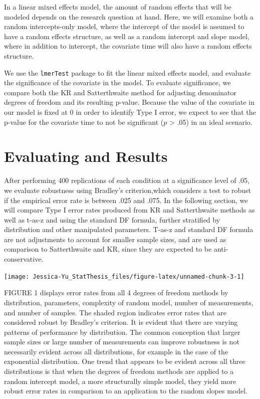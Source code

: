 \documentclass[12pt, twoside]{amherstthesis}
\begin{document}
In a linear mixed effects model, the amount of random effects that will be modeled depends on the research question at hand. Here, we will examine both a random intercepts-only model, where the intercept of the model is assumed to have a random effects structure, as well as a random intercept and slope model, where in addition to intercept, the covariate time will also have a random effects structure.

We use the \texttt{lmerTest} package to fit the linear mixed effects model, and evaluate the significance of the covariate in the model. To evaluate significance, we compare both the KR and Satterthwaite method for adjusting denominator degrees of freedom and its resulting p-value. Because the value of the covariate in our model is fixed at 0 in order to identify Type I error, we expect to see that the p-value for the covariate time to not be significant (\(p\) \textgreater{} .05) in an ideal scenario.

\hypertarget{evaluating-and-results}{%
\section{Evaluating and Results}\label{evaluating-and-results}}

After performing 400 replications of each condition at a significance level of .05, we evaluate robustness using Bradley's criterion,which considers a test to robust if the empirical error rate is between .025 and .075. In the following section, we will compare Type I error rates produced from KR and Satterthwaite methods as well as t-as-z and using the standard DF formula, further stratified by distribution and other manipulated parameters. T-as-z and standard DF formula are not adjustments to account for smaller sample sizes, and are used as comparison to Satterthwaite and KR, since they are expected to be anti-conservative.
\begin{center}\texttt{[image: Jessica-Yu\_StatThesis\_files/figure-latex/unnamed-chunk-3-1]} \end{center}

FIGURE 1 displays error rates from all 4 degrees of freedom methods by distribution, parameters, complexity of random model, number of measurements, and number of samples. The shaded region indicates error rates that are considered robust by Bradley's criterion. It is evident that there are varying patterns of performance by distribution. The common conception that larger sample sizes or large number of measurements can improve robustness is not necessarily evident across all distributions, for example in the case of the exponential distribution. One trend that appears to be evident across all three distributions is that when the degrees of freedom methods are applied to a random intercept model, a more structurally simple model, they yield more robust error rates in comparison to an application to the random slopes model.
\end{document}
